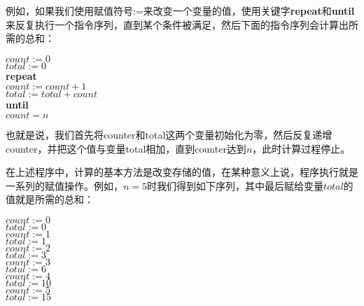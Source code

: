 例如，如果我们使用赋值符号:=来改变一个变量的值，使用关键字\textbf{repeat}和\textbf{until}来反复执行一个指令序列，直到某个条件被满足，然后下面的指令序列会计算出所需的总和：

\noindent\hspace*{1cm} $count := 0$\\
\hspace*{1cm} $total := 0$\\
\hspace*{1cm} \textbf{repeat}\\
\hspace*{1cm} \quad $count := count + 1$\\
\hspace*{1cm} \quad $total := total + count$\\
\hspace*{1cm} \textbf{until}\\
\hspace*{1cm} \quad $count = n$

也就是说，我们首先将counter和total这两个变量初始化为零，然后反复递增counter，并把这个值与变量total相加，直到counter达到$n$，此时计算过程停止。

在上述程序中，计算的基本方法是改变存储的值，在某种意义上说，程序执行就是一系列的赋值操作。例如，$n
= 5$时我们得到如下序列，其中最后赋给变量$total$的值就是所需的总和：

\noindent\hspace*{1cm} $count := 0$\\ 
\hspace*{1cm} $total := 0$\\
\hspace*{1cm} $count := 1$\\
\hspace*{1cm} $total := 1$\\
\hspace*{1cm} $count := 2$\\
\hspace*{1cm} $total := 3$\\
\hspace*{1cm} $count := 3$\\
\hspace*{1cm} $total := 6$\\
\hspace*{1cm} $count := 4$\\
\hspace*{1cm} $total := 10$\\
\hspace*{1cm} $count := 5$\\
\hspace*{1cm} $total := 15$\\

